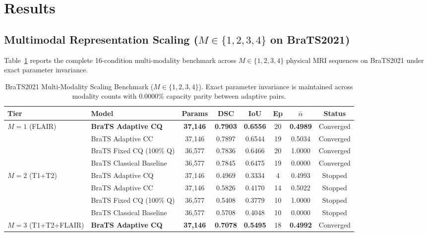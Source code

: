 \section{Results}
\label{sec:results}

\subsection{Multimodal Representation Scaling (\texorpdfstring{$M \in \{1, 2, 3, 4\}$}{M in 1..4} on BraTS2021)}
Table~\ref{tab:brats_matrix} reports the complete 16-condition multi-modality benchmark across $M \in \{1, 2, 3, 4\}$ physical MRI sequences on BraTS2021 under exact parameter invariance.

\begin{table}[htbp]
\caption{BraTS2021 Multi-Modality Scaling Benchmark ($M \in \{1, 2, 3, 4\}$). Exact parameter invariance is maintained across modality counts with 0.0000\% capacity parity between adaptive pairs.}
\label{tab:brats_matrix}
\footnotesize
\setlength{\tabcolsep}{2.2pt}
\begin{tabular}{@{}llcccccc@{}}
\toprule
\textbf{Tier} & \textbf{Model} & \textbf{Params} & \textbf{DSC} & \textbf{IoU} & \textbf{Ep} & $\bar{\alpha}$ & \textbf{Status} \\
\midrule
\multirow{4}{*}{$M=1$ (FLAIR)} 
& \textbf{BraTS Adaptive CQ} & \textbf{37,146} & \textbf{0.7903} & \textbf{0.6556} & 20 & \textbf{0.4989} & Converged \\
& BraTS Adaptive CC & 37,146 & 0.7897 & 0.6544 & 19 & 0.5034 & Converged \\
& BraTS Fixed CQ (100\% Q) & 36,577 & 0.7836 & 0.6466 & 20 & 1.0000 & Converged \\
& BraTS Classical Baseline & 36,577 & 0.7845 & 0.6475 & 19 & 0.0000 & Converged \\
\midrule
\multirow{4}{*}{$M=2$ (T1+T2)} 
& BraTS Adaptive CQ & 37,146 & 0.4969 & 0.3334 & 4 & 0.4993 & Stopped \\
& BraTS Adaptive CC & 37,146 & 0.5826 & 0.4170 & 14 & 0.5022 & Stopped \\
& BraTS Fixed CQ (100\% Q) & 36,577 & 0.5408 & 0.3779 & 10 & 1.0000 & Stopped \\
& BraTS Classical Baseline & 36,577 & 0.5708 & 0.4048 & 10 & 0.0000 & Stopped \\
\midrule
\multirow{4}{*}{$M=3$ (T1+T2+FLAIR)} 
& \textbf{BraTS Adaptive CQ} & \textbf{37,146} & \textbf{0.7078} & \textbf{0.5495} & 18 & \textbf{0.4992} & Converged \\

\end{tabular}
\end{table}
